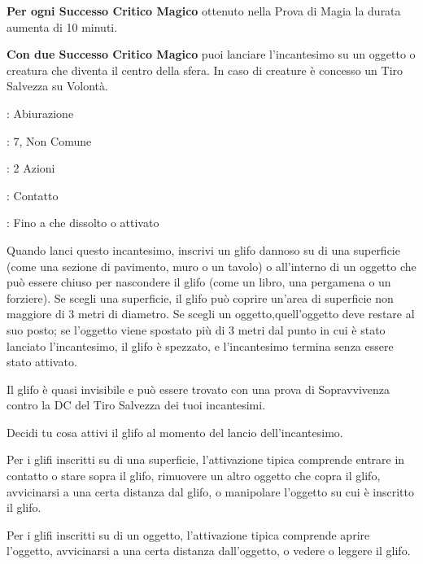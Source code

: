 \begin{multicols}{2}
\textbf{Per ogni Successo Critico Magico} ottenuto nella Prova di Magia la durata aumenta di 10 minuti.

\textbf{Con due Successo Critico Magico} puoi lanciare l'incantesimo su un oggetto o creatura che diventa il centro della sfera. In caso di creature è concesso un Tiro Salvezza su Volontà.

\noindent\colorbox{OBSSgold!10}{
\begin{minipage}{0.95\linewidth}
\begin{description}[noitemsep, topsep=0pt, parsep=0pt, partopsep=0pt, leftmargin=0cm, labelwidth=1.3cm]
	\item[\textbf{Lista}]: Abiurazione
	\item[\textbf{Livello}]: 7, Non Comune
	\item[\textbf{Lancio}]: 2 Azioni
	\item[\textbf{Gittata}]: Contatto
	\item[\textbf{Durata}]: Fino a che dissolto o attivato
\end{description}
\end{minipage}}\smallskip

Quando lanci questo incantesimo, inscrivi un glifo dannoso su di una superficie (come una sezione di pavimento, muro o un tavolo) o all'interno di un oggetto che può essere chiuso per nascondere il glifo (come un libro, una pergamena o un forziere). Se scegli una superficie, il glifo può coprire un'area di superficie non maggiore di 3 metri di diametro. Se scegli un oggetto,quell'oggetto deve restare al suo posto; se l'oggetto viene spostato più di 3 metri dal punto in cui è stato lanciato l'incantesimo, il glifo è spezzato, e l'incantesimo termina senza essere stato attivato.

Il glifo è quasi invisibile e può essere trovato con una prova di Sopravvivenza contro la DC del Tiro Salvezza dei tuoi incantesimi.

Decidi tu cosa attivi il glifo al momento del lancio dell'incantesimo.

Per i glifi inscritti su di una superficie, l'attivazione tipica comprende entrare in contatto o stare sopra il glifo, rimuovere un altro oggetto che copra il glifo, avvicinarsi a una certa distanza dal glifo, o manipolare l'oggetto su cui è inscritto il glifo.

Per i glifi inscritti su di un oggetto, l'attivazione tipica comprende aprire l'oggetto, avvicinarsi a una certa distanza dall'oggetto, o vedere o leggere il glifo.


\end{multicols}
